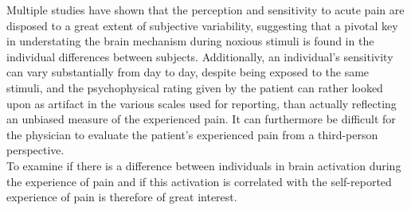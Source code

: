 Multiple studies \cite{Coghill2003,Kim2004,Emerson2014,Davis2017} have shown that the perception and sensitivity to acute pain are disposed to a great extent of subjective variability, suggesting that a pivotal key in understating the brain mechanism during noxious stimuli is found in the individual differences between subjects. Additionally, an individual's sensitivity can vary substantially from day to day, despite being exposed to the same stimuli, and the psychophysical rating given by the patient can rather looked upon as artifact in the various scales used for reporting, than actually reflecting an unbiased measure of the experienced pain. It can furthermore be difficult for the physician to evaluate the patient's experienced pain from a third-person perspective. \cite{Coghill2003} \\
To examine if there is a difference between individuals in brain activation during the experience of pain and if this activation is correlated with the self-reported experience of pain is therefore of great interest. \cite{Coghill2003} \\

